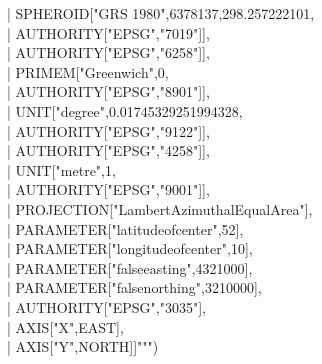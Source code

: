 \documentclass {article}
\begin{document}
     |     \hspace*{8mm} SPHEROID["GRS 1980",6378137,298.257222101,\\
     |     \hspace*{10mm} AUTHORITY["EPSG","7019"]],\\
     |     \hspace*{8mm} AUTHORITY["EPSG","6258"]],\\
     |     \hspace*{6mm} PRIMEM["Greenwich",0,\\
     |     \hspace*{8mm} AUTHORITY["EPSG","8901"]],\\
     |     \hspace*{6mm} UNIT["degree",0.01745329251994328,\\
     |     \hspace*{8mm} AUTHORITY["EPSG","9122"]],\\
     |     \hspace*{6mm} AUTHORITY["EPSG","4258"]],\\
     |     \hspace*{4mm} UNIT["metre",1,\\
     |     \hspace*{6mm} AUTHORITY["EPSG","9001"]],\\
     |     \hspace*{4mm} PROJECTION["Lambert\underline{\space}Azimuthal\underline{\space}Equal\underline{\space}Area"],\\
     |     \hspace*{4mm} PARAMETER["latitude\underline{\space}of\underline{\space}center",52],\\
     |     \hspace*{4mm} PARAMETER["longitude\underline{\space}of\underline{\space}center",10],\\
     |     \hspace*{4mm} PARAMETER["false\underline{\space}easting",4321000],\\
     |     \hspace*{4mm} PARAMETER["false\underline{\space}northing",3210000],\\
     |     \hspace*{4mm} AUTHORITY["EPSG","3035"],\\
     |     \hspace*{4mm} AXIS["X",EAST],\\
     |     \hspace*{4mm} AXIS["Y",NORTH]]""")\\
\end{document}
